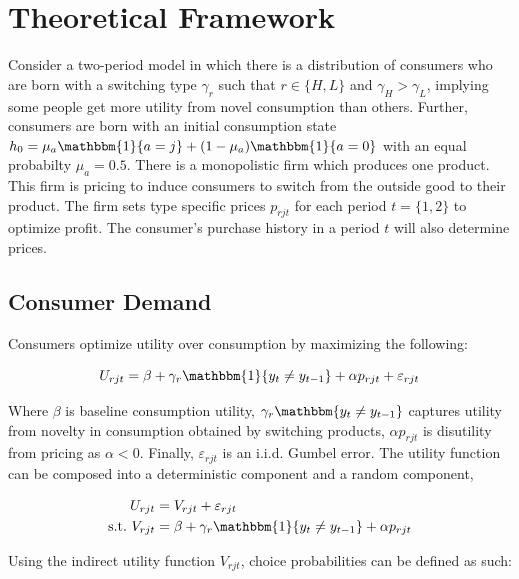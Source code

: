 \section{Theoretical Framework}
\label{sec:theory}

Consider a two-period model in which there is a distribution of consumers who are born with a switching type
$\gamma_r$ such that $r\in\{H,L\}$ and $\gamma_H>\gamma_L$, implying some people
get more utility from novel consumption than others. Further, consumers are born
with an initial consumption state $h_0 = \mu_a\mathbbm{1}\{a=j\} +
(1-\mu_a)\mathbbm{1}\{a=0\}$ with an equal probabilty $\mu_a=0.5$. There is a monopolistic firm which produces one product. This firm is pricing to
induce consumers to switch from the outside good to their product. The firm sets type specific prices $p_{rjt}$ for each period $t=\{1,2\}$ to optimize profit. The consumer's purchase history in a period $t$ will also determine prices. 


\subsection{Consumer Demand}
\label{subsec:model-demand}

Consumers optimize utility over consumption by maximizing the following:

\begin{equation}
  U_{rjt} = \beta + \gamma_r\mathbbm{1}\{y_t\ne y_{t-1}\} + \alpha p_{rjt} +
  \varepsilon_{rjt}
\end{equation}

Where $\beta$ is baseline consumption utility, $\gamma_r\mathbbm{y_t\ne y_{t-1}}$
captures utility from novelty in consumption obtained by switching products,
$\alpha p_{rjt}$ is disutility from pricing as $\alpha<0$. Finally,
$\varepsilon_{rjt}$ is an i.i.d. Gumbel error. The utility function can be
composed into a deterministic component and a random component,

\begin{align*}
  U_{rjt} &= V_{rjt} + \varepsilon_{rjt}\\
  \text{s.t.} \ V_{rjt} &= \beta + \gamma_r\mathbbm{1}\{y_t\ne y_{t-1}\} + \alpha p_{rjt}
\end{align*}

Using the indirect utility function $V_{rjt}$, choice probabilities can be
defined as such:

